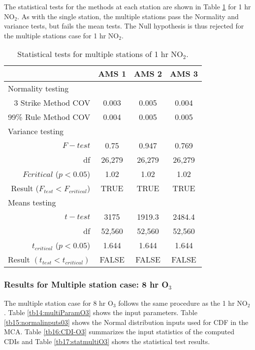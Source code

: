 The statistical tests for the methods at each station are shown in Table \ref{tb13:stat-testsNO2} for 1 hr NO$_{2}$. As with the single station, the multiple stations pass the Normality and variance tests, but fails the mean tests. The Null hypothesis is thus rejected for the multiple stations case for 1 hr NO$_{2}$.
% 
\begin{table}[H]
\centering
\caption{Statistical tests for multiple stations of 1 hr NO$_{2}$.}
\label{tb13:stat-testsNO2}
\begin{tabular}{@{}rccc@{}}
\toprule
\multicolumn{1}{l}{} & \textbf{AMS 1} & \textbf{AMS 2} & \textbf{AMS 3} \\ \midrule
\multicolumn{1}{l}{Normality testing} &  &  &  \\
3 Strike Method COV & 0.003 & 0.005 & 0.004 \\
99\% Rule Method COV & 0.004 & 0.005 & 0.005 \\
\multicolumn{1}{l}{Variance testing} &  &  &  \\
$F-test$ & 0.75 & 0.947 & 0.769 \\
df & 26,279 & 26,279 & 26,279 \\
$Fcritical$ ($p<0.05$) & 1.02 & 1.02 & 1.02 \\
Result ($F_{test} < F_{critical}$) & TRUE & TRUE & TRUE \\
\multicolumn{1}{l}{Means testing} &  &  &  \\
$t-test$ & 3175 & 1919.3 & 2484.4 \\
df & 52,560 & 52,560 & 52,560 \\
$t_{critical}$ ($p<0.05$) & 1.644 & 1.644 & 1.644 \\
\multicolumn{1}{l}{Result $(t_{test} < t_{critical})$} & FALSE & FALSE & FALSE \\ \bottomrule
\end{tabular}
\end{table}

\subsubsection{Results for Multiple station case: 8 hr O$_{3}$}

The multiple station case for 8 hr O$_{3}$ follows the same procedure as the 1 hr NO$_{2}$. Table \ref{tb14:multiParamO3} shows the input parameters. Table \ref{tb15:normalinputs03} shows the Normal distribution inputs used for CDF in the MCA. Table \ref{tb16:CDI-O3} summarizes the input statistics of the computed CDIs and Table \ref{tb17:statmultiO3} shows the statistical test results.

